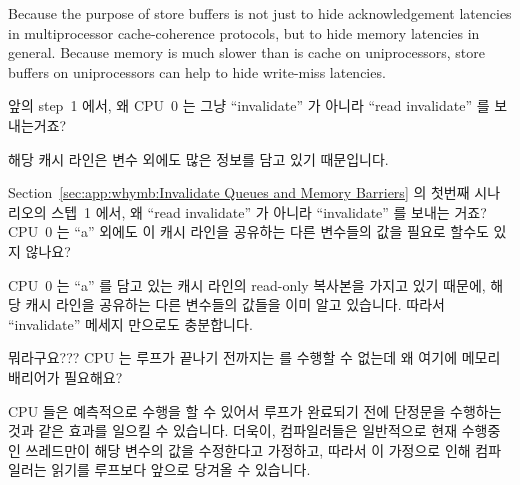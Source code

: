 \begin{enumerate}
	Because the purpose of store buffers is not just to hide
	acknowledgement latencies in multiprocessor cache-coherence protocols,
	but to hide memory latencies in general.
	Because memory is much slower than is cache on uniprocessors,
	store buffers on uniprocessors can help to hide write-miss
	latencies.
	\fi

\QuickQ{}
	앞의 step~1 에서, 왜 CPU~0 는 그냥 ``invalidate'' 가 아니라 ``read
	invalidate'' 를 보내는거죠?

\QuickA{}
	해당 캐시 라인은 변수  외에도 많은 정보를 담고 있기 때문입니다.

\QuickQ{}
	Section~\ref{sec:app:whymb:Invalidate Queues and Memory Barriers} 의
	첫번째 시나리오의 스텝~1 에서, 왜 ``read invalidate'' 가 아니라
	``invalidate'' 를 보내는 거죠?
	CPU~0 는 ``a'' 외에도 이 캐시 라인을 공유하는 다른 변수들의 값을 필요로
	할수도 있지 않나요?

\QuickA{}
	CPU~0 는 ``a'' 를 담고 있는 캐시 라인의 read-only 복사본을 가지고 있기
	때문에, 해당 캐시 라인을 공유하는 다른 변수들의 값들을 이미 알고
	있습니다.
	따라서 ``invalidate'' 메세지 만으로도 충분합니다.

\QuickQ{}
	뭐라구요???
	CPU 는  루프가 끝나기 전까지는  를 수행할 수
	없는데 왜 여기에 메모리 배리어가 필요해요?

\QuickA{}
	CPU 들은 예측적으로 수행을 할 수 있어서  루프가 완료되기 전에
	단정문을 수행하는 것과 같은 효과를 일으킬 수 있습니다.
	더욱이, 컴파일러들은 일반적으로 현재 수행중인 쓰레드만이 해당 변수의
	값을 수정한다고 가정하고, 따라서 이 가정으로 인해 컴파일러는 
	읽기를 루프보다 앞으로 당겨올 수 있습니다.


\end{enumerate}
